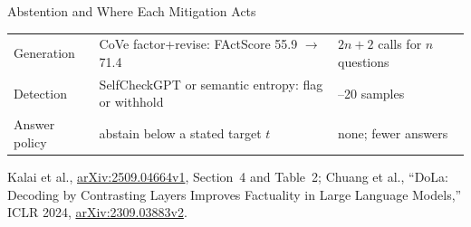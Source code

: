 \begin{frame}{Abstention and Where Each Mitigation Acts}
{\begin{tabular}{>{\raggedright\arraybackslash}p{1.7cm} >{\raggedright\arraybackslash}p{7.4cm} >{\raggedright\arraybackslash}p{3.0cm}}
    Generation & CoVe factor+revise: FActScore 55.9 $\to$ 71.4 & $2n{+}2$ calls for $n$ questions \\
    Detection & SelfCheckGPT or semantic entropy: flag or withhold & 10--20 samples \\
    Answer policy & abstain below a stated target $t$ & none; fewer answers \\
    \bottomrule
  \end{tabular}\par}
  \vspace{0.1em}
  {\scriptsize Kalai et al., \href{https://arxiv.org/abs/2509.04664v1}{arXiv:2509.04664v1}, Section~4 and Table~2; Chuang et al., ``DoLa: Decoding by Contrasting Layers Improves Factuality in Large Language Models,'' ICLR 2024, \href{https://arxiv.org/abs/2309.03883v2}{arXiv:2309.03883v2}.\par}
\end{frame}
